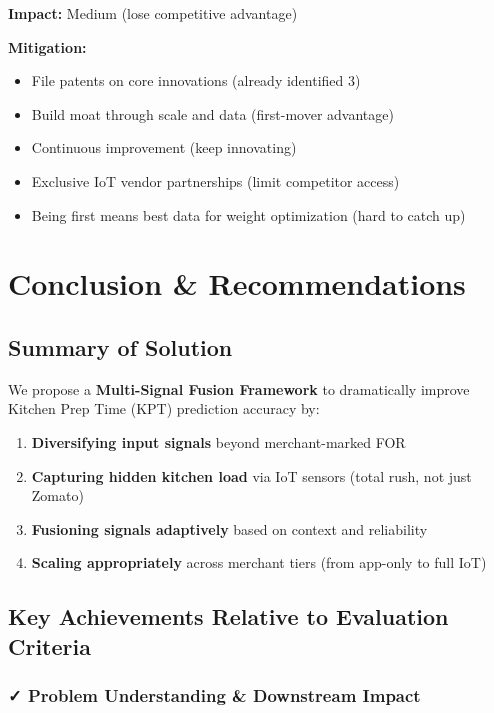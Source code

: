 \documentclass[11pt,a4paper]{article}
\begin{document}
\textbf{Impact:} Medium (lose competitive advantage)

\textbf{Mitigation:}
\begin{itemize}[leftmargin=*]
    \item File patents on core innovations (already identified 3)
    \item Build moat through scale and data (first-mover advantage)
    \item Continuous improvement (keep innovating)
    \item Exclusive IoT vendor partnerships (limit competitor access)
    \item Being first means best data for weight optimization (hard to catch up)
\end{itemize}

\newpage

\section{Conclusion \& Recommendations}

\subsection{Summary of Solution}

We propose a \textbf{Multi-Signal Fusion Framework} to dramatically improve Kitchen Prep Time (KPT) prediction accuracy by:

\begin{enumerate}[leftmargin=*]
    \item \textbf{Diversifying input signals} beyond merchant-marked FOR
    \item \textbf{Capturing hidden kitchen load} via IoT sensors (total rush, not just Zomato)
    \item \textbf{Fusioning signals adaptively} based on context and reliability
    \item \textbf{Scaling appropriately} across merchant tiers (from app-only to full IoT)
\end{enumerate}

\subsection{Key Achievements Relative to Evaluation Criteria}

\subsubsection{✓ Problem Understanding \& Downstream Impact}
\end{document}
